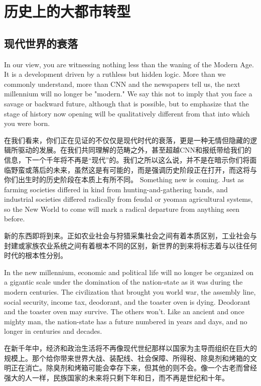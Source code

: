 \chapter[历史上大都市的转型]{历史上的大都市转型}

\section{现代世界的衰落}
\begin{paracol}{2}
In our view, you are witnessing nothing less than the waning of the Modern Age. It is a development driven by a ruthless but hidden logic. More than we commonly understand, more than CNN and the newspapers tell us, the next millennium will no longer be "modern." We say this not to imply that you face a savage or backward future, although that is possible, but to emphasize that the stage of history now opening will be qualitatively different from that into which you were born.

\switchcolumn
在我们看来，你们正在见证的不仅仅是现代时代的衰落，更是一种无情但隐藏的逻辑所驱动的发展。在我们共同理解的范畴之外，甚至超越CNN和报纸带给我们的信息，下一个千年将不再是“现代”的。我们之所以这么说，并不是在暗示你们将面临野蛮或落后的未来，虽然这是有可能的，而是强调历史阶段正在打开，而这将与你们出生时的历史阶段在本质上有所不同。
\switchcolumn*
Something new is coming. Just as farming societies differed in kind from hunting-and-gathering bands, and industrial societies differed radically from feudal or yeoman agricultural systems, so the New World to come will mark a radical departure from anything seen before.

\switchcolumn
新的东西即将到来。正如农业社会与狩猎采集社会之间有着本质区别，工业社会与封建或家族农业系统之间有着根本不同的区别，新世界的到来将标志着与以往任何时代的根本性分别。

\switchcolumn*
In the new millennium, economic and political life will no longer be organized on a gigantic scale under the domination of the nation-state as it was during the modern centuries. The civilization that brought you world war, the assembly line, social security, income tax, deodorant, and the toaster oven is dying. Deodorant and the toaster oven may survive. The others won't. Like an ancient and once mighty man, the nation-state has a future numbered in years and days, and no longer in centuries and decades.

\switchcolumn
在新千年中，经济和政治生活将不再像现代世纪那样以国家为主导而组织在巨大的规模上。那个给你带来世界大战、装配线、社会保障、所得税、除臭剂和烤箱的文明正在消亡。除臭剂和烤箱可能会幸存下来，但其他的则不会。像一个古老而曾经强大的人一样，民族国家的未来将只剩下年和日，而不再是世纪和十年。


\end{paracol}
